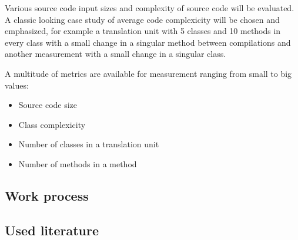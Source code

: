\documentclass{VUMIFPSbakalaurinis}
\begin{document}
\begin{samepage}
Various source code input sizes and complexity of source code will be evaluated.
A classic looking case study of average code complexicity will be chosen and emphasized, for example a translation unit with 5 classes and 10 methods in every class with a small change in a singular method between compilations and another measurement with a small change in a singular class.

A multitude of metrics are available for measurement ranging from small to big values:

\begin{itemize}
  \item Source code size
	\item Class complexicity
	\item Number of classes in a translation unit
	\item Number of methods in a method
\end{itemize}

\subsection{Work process}
\subsection{Used literature}
\end{samepage}

\printbibliography[heading=bibintoc]  %


\appendix  %
\end{document}
